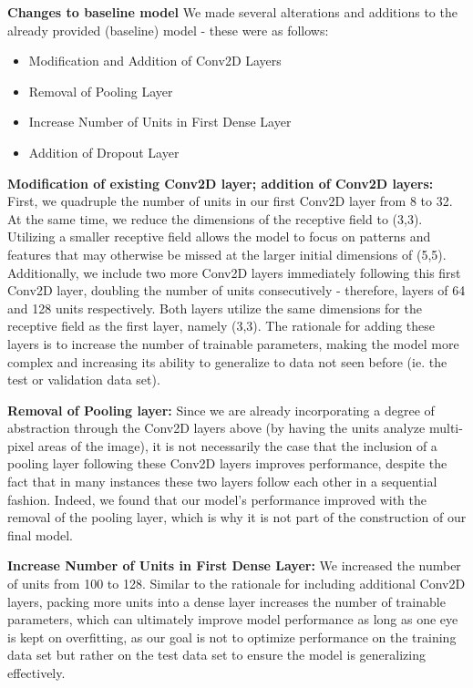 \documentclass[11pt]{article}
\begin{document}
\begin{center}
{\bf Changes to baseline model}
\linebreak
We made several alterations and additions to the already provided (baseline) model - these were as follows:
\begin{itemize}
  \item Modification and Addition of Conv2D Layers
  \item Removal of Pooling Layer
  \item Increase Number of Units in First Dense Layer
  \item Addition of Dropout Layer
\end{itemize}
{\bf Modification of existing Conv2D layer; addition of Conv2D layers:}
First, we quadruple the number of units in our first Conv2D layer from 8 to 32. At the same time, we reduce the dimensions of the receptive field to (3,3).
Utilizing a smaller receptive field allows the model to focus on patterns and features that may otherwise be missed at the larger initial dimensions of (5,5).
Additionally, we include two more Conv2D layers immediately following this first Conv2D layer, doubling the number of units consecutively - therefore, layers
of 64 and 128 units respectively. Both layers utilize the same dimensions for the receptive field as the first layer, namely (3,3). The rationale for adding
these layers is to increase the number of trainable parameters, making the model more complex and increasing its ability to generalize to data not seen before
(ie. the test or validation data set).

{\bf Removal of Pooling layer:}
Since we are already incorporating a degree of abstraction through the Conv2D layers above (by having the units analyze multi-pixel areas of the image), it is
not necessarily the case that the inclusion of a pooling layer following these Conv2D layers improves performance, despite the fact that in many instances
these two layers follow each other in a sequential fashion. Indeed, we found that our model's performance improved with the removal of the pooling layer,
which is why it is not part of the construction of our final model.

{\bf Increase Number of Units in First Dense Layer:}
We increased the number of units from 100 to 128. Similar to the rationale for including additional Conv2D layers, packing more units into a dense layer
increases the number of trainable parameters, which can ultimately improve model performance as long as one eye is kept on overfitting, as our goal is
not to optimize performance on the training data set but rather on the test data set to ensure the model is generalizing effectively.


\end{center}
\end{document}
